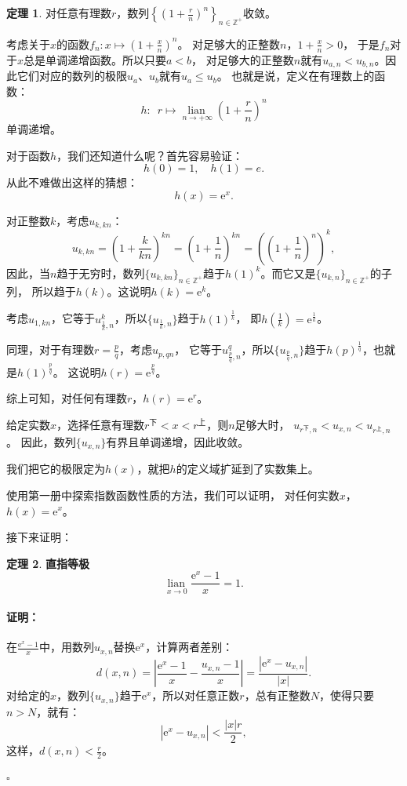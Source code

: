 \documentclass[12pt,UTF8]{ctexbook}
\newcommand{\lian}[1]{
    \underset{#1}{\operatorname{lian}\,}
}
\theoremstyle{definition}
\newtheorem{tm}{定理}[section]
\theoremstyle{plain}
\renewenvironment{proof}{\paragraph{\textbf{证明：}}}{\hfill$\square$}
\begin{document}
\begin{appendix}
\begin{tm}\label{tm:b-1-40}
    对任意有理数$r$，数列$\left\{\left(1 + \frac{r}{n}\right)^n\right\}_{n\in\mathbb{Z}^+}$收敛。
\end{tm}

考虑关于$x$的函数$f_{n} : x \mapsto \left(1 + \frac{x}{n}\right)^n $。
对足够大的正整数$n$，$1 + \frac{x}{n} > 0$， 于是$f_n$对于$x$总是单调递增函数。所以只要$a < b$，
对足够大的正整数$n$就有$u_{a,n} < u_{b,n}$。因此它们对应的数列的极限$u_a$、$u_b$就有$u_a \leqslant u_b$。
也就是说，定义在有理数上的函数：
$$ h: \,\,\, r \mapsto \lian{n\to +\infty}  \left(1 + \frac{r}{n}\right)^n $$
单调递增。

对于函数$h$，我们还知道什么呢？首先容易验证：
$$ h(0) = 1, \quad h(1) = e.$$ 
从此不难做出这样的猜想：
$$ h(x) = \mathrm{e}^x. $$

对正整数$k$，考虑$u_{k,kn}$：
$$ u_{k,kn} = \left(1 + \frac{k}{kn}\right)^{kn} = \left(1 + \frac{1}{n}\right)^{kn} = \left(\left(1 + \frac{1}{n}\right)^{n}\right)^{k}, $$
因此，当$n$趋于无穷时，数列$\{u_{k,kn}\}_{n\in\mathbb{Z}^+}$趋于$h(1)^k$。而它又是$\{u_{k,n}\}_{n\in\mathbb{Z}^+}$的子列，
所以趋于$h(k)$。这说明$h(k) = \mathrm{e}^k$。

考虑$u_{1,kn}$，它等于$u_{\frac{1}{k},n}^k$，所以$\{u_{\frac{1}{k},n}\}$趋于$h(1)^{\frac{1}{k}}$，
即$h(\frac{1}{k}) = \mathrm{e}^{\frac{1}{k}}$。

同理，对于有理数$r = \frac{p}{q}$，考虑$u_{p,qn}$，
它等于$u_{\frac{p}{q},n}^q$，所以$\{u_{\frac{p}{q},n}\}$趋于$h(p)^{\frac{1}{q}}$，也就是$h(1)^{\frac{p}{q}}$。
这说明$h(r) = \mathrm{e}^{\frac{p}{q}}$。

综上可知，对任何有理数$r$，$h(r) = \mathrm{e}^r$。

给定实数$x$，选择任意有理数$r^{\text{下}} < x < r^{\text{上}}$，则$n$足够大时，
$u_{r^\text{下},n} < u_{x,n} < u_{r^\text{上},n}$。
因此，数列$\{u_{x,n}\}$有界且单调递增，因此收敛。

我们把它的极限定为$h(x)$，就把$h$的定义域扩延到了实数集上。

使用第一册中探索指数函数性质的方法，我们可以证明，
对任何实数$x$，$h(x) = \mathrm{e}^x$。

接下来证明：
\begin{tm}{\textbf{直指等极}}\label{tm:b-1-50}
    $$\lian{x\to 0} \frac{\mathrm{e}^x - 1}{x} = 1.$$
\end{tm}

\begin{proof}
    在$\frac{\mathrm{e}^x - 1}{x}$中，用数列$u_{x,n}$替换$\mathrm{e}^x$，计算两者差别：
    $$ d(x, n) = \left|\frac{\mathrm{e}^x - 1}{x} - \frac{u_{x,n} - 1}{x}\right| = \frac{\left|\mathrm{e}^x - u_{x,n}\right|}{\left|x\right|}. $$
    对给定的$x$，数列$\{u_{x,n}\}$趋于$\mathrm{e}^x$，所以对任意正数$r$，总有正整数$N$，使得只要$n>N$，就有：
    $$ \left|\mathrm{e}^x - u_{x,n}\right| < \frac{|x|r}{2},$$
    这样，$d(x, n) < \frac{r}{2}$。


\end{proof}
\end{appendix}
\end{document}

